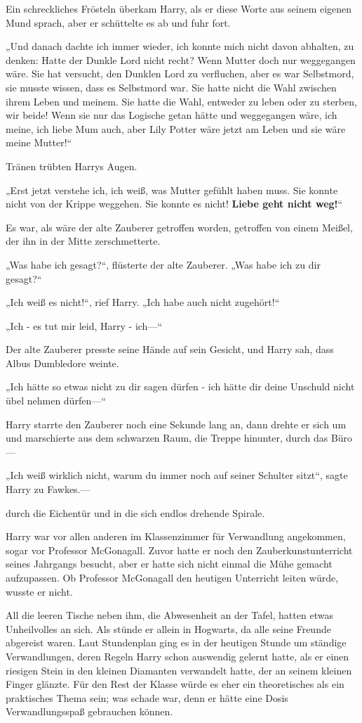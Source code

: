 {Ein schreckliches Frösteln überkam Harry, als er diese Worte aus seinem eigenen Mund sprach, aber er schüttelte es ab und fuhr fort.

„Und danach dachte ich immer wieder, ich konnte mich nicht davon abhalten, zu denken: Hatte der Dunkle Lord nicht recht? Wenn Mutter doch nur weggegangen wäre. Sie hat versucht, den Dunklen Lord zu verfluchen, aber es war Selbstmord, sie musste wissen, dass es Selbstmord war. Sie hatte nicht die Wahl zwischen ihrem Leben und meinem. Sie hatte die Wahl, entweder zu leben oder zu sterben, wir beide! Wenn sie nur das Logische getan hätte und weggegangen wäre, ich meine, ich liebe Mum auch, aber Lily Potter wäre jetzt am Leben und sie wäre meine Mutter!“

Tränen trübten Harrys Augen.

„Erst jetzt verstehe ich, ich weiß, was Mutter gefühlt haben muss. Sie konnte nicht von der Krippe weggehen. Sie konnte es nicht! \textbf{Liebe geht nicht weg!}“

Es war, als wäre der alte Zauberer getroffen worden, getroffen von einem Meißel, der ihn in der Mitte zerschmetterte.

„Was habe ich gesagt?“, flüsterte der alte Zauberer. „Was habe ich zu dir gesagt?“

„Ich weiß es nicht!“, rief Harry. „Ich habe auch nicht zugehört!“

„Ich - es tut mir leid, Harry - ich—“

Der alte Zauberer presste seine Hände auf sein Gesicht, und Harry sah, dass Albus Dumbledore weinte.

„Ich hätte so etwas nicht zu dir sagen dürfen - ich hätte dir deine Unschuld nicht übel nehmen dürfen—“

Harry starrte den Zauberer noch eine Sekunde lang an, dann drehte er sich um und marschierte aus dem schwarzen Raum, die Treppe hinunter, durch das Büro—

„Ich weiß wirklich nicht, warum du immer noch auf seiner Schulter sitzt“, sagte Harry zu Fawkes.—

durch die Eichentür und in die sich endlos drehende Spirale.

Harry war vor allen anderen im Klassenzimmer für Verwandlung angekommen, sogar vor Professor McGonagall. Zuvor hatte er noch den Zauberkunstunterricht seines Jahrgangs besucht, aber er hatte sich nicht einmal die Mühe gemacht aufzupassen. Ob Professor McGonagall den heutigen Unterricht leiten würde, wusste er nicht.

All die leeren Tische neben ihm, die Abwesenheit an der Tafel, hatten etwas Unheilvolles an sich. Als stünde er allein in Hogwarts, da alle seine Freunde abgereist waren. Laut Stundenplan ging es in der heutigen Stunde um ständige Verwandlungen, deren Regeln Harry schon auswendig gelernt hatte, als er einen riesigen Stein in den kleinen Diamanten verwandelt hatte, der an seinem kleinen Finger glänzte. Für den Rest der Klasse würde es eher ein theoretisches als ein praktisches Thema sein; was schade war, denn er hätte eine Dosis Verwandlungsspaß gebrauchen können.

}
